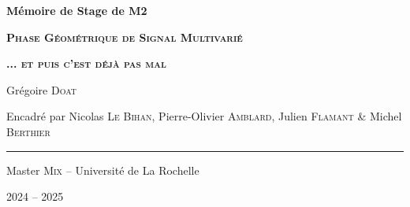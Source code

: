 




	
	
	
	
	
	
\begin{titlepage}
	
	\centering
	\vspace{1.5cm}
	{\huge\textbf{Mémoire de Stage de M2}}\par
	
	\vspace{2cm}
	{\huge\textbf{\textsc{Phase Géométrique de Signal Multivarié}}}\par 
	\vspace{0.5cm}
	
	{\huge\textbf{\textsc{... et puis c'est déjà pas mal}}}\par
	\vspace{2.0cm}
	
	{\large Grégoire \textsc{Doat}}\par
	\vspace{0.5cm}
	\vfill
	
	{\large Encadré par Nicolas \textsc{Le Bihan}, Pierre-Olivier \textsc{Amblard}, Julien \textsc{Flamant} \& Michel \textsc{Berthier}}\par
	\vspace{0.5cm}
	
	\rule{10cm}{0.4pt}\par
	\vspace{0.7cm}
	
	{Master \textsc{Mix} -- Université de La Rochelle}\par
	\vspace{0.25cm}
	
	{\large 2024 -- 2025}
\end{titlepage}
	
	
	
